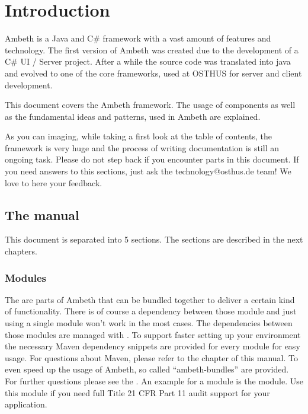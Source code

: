 \chapter{Introduction}
\label{Introduction}


Ambeth is a Java and C\# framework with a vast amount of features and technology. The first version of Ambeth was created due to the development
of a C\# UI / Server project. After a while the source code was translated into java and evolved to one of the core frameworks, used at OSTHUS\textsuperscript{\textregistered} for server and client development.

This document covers the Ambeth framework. The usage of components as well as the fundamental ideas and patterns, used in Ambeth are explained.

As you can imaging, while taking a first look at the table of contents, the framework is very huge and the process of writing documentation is still an ongoing task. Please do not step back if you encounter \TODO parts in this document. If you need answers to this sections, just ask the technology@osthus.de team! We love to here your feedback.

\section{The manual}
This document is separated into 5 sections. The sections are described in the next chapters.
\subsection{Modules}

The  are parts of Ambeth that can be bundled together to deliver a certain kind of functionality. There is of course a dependency between those module and 
just using a single module won't work in the most cases. The dependencies between those modules are managed with . To support faster setting up your environment the
necessary Maven dependency snippets are provided for every module for easy usage. For questions about Maven, please refer to the  chapter of this manual.
To even speed up the usage of Ambeth, so called "`ambeth-bundles"' are provided. For further questions please see the .
An example for a module is the  module. Use this module if you need full  Title 21 CFR Part 11 audit support for your application.

